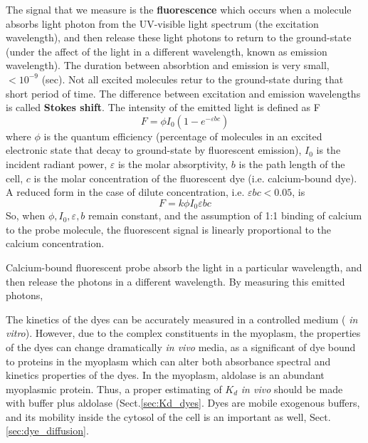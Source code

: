 The signal that we measure is the {\bf fluorescence} which occurs when a
molecule absorbs light photon from the UV-visible light spectrum (the excitation
wavelength), and then release these light photons to return to the ground-state
(under the affect of the light in a different wavelength, known as emission
wavelength). The duration between absorbtion and emission is very small,
$<10^{-9}$ (sec). Not all excited molecules retur to the ground-state during
that short period of time. The difference between excitation and emission
wavelengths is called {\bf Stokes shift}. The intensity of the emitted light is
defined as F
\begin{equation}
F = \phi I_0 \left( 1-e^{-\varepsilon bc} \right)
\end{equation} 
where $\phi$ is the quantum efficiency (percentage of molecules in an excited
electronic state that decay to ground-state by fluorescent emission), $I_0$ is
the incident radiant power, $\varepsilon$ is the molar absorptivity, $b$ is the
path length of the cell, $c$ is the molar concentration of the fluorescent dye
(i.e. calcium-bound dye). A reduced form in the case of dilute concentration,
i.e. $\varepsilon bc <0.05$, is 
\begin{equation}
F = k \phi I_0 \varepsilon bc
\end{equation}
So, when $\phi, I_0, \varepsilon, b$ remain constant, and the assumption of
1:1 binding of calcium to the probe molecule, the fluorescent signal is linearly
proportional to the calcium concentration. 


Calcium-bound fluorescent probe absorb the light in a particular
wavelength, and then release the photons in a different wavelength. By measuring
this emitted photons, 

The kinetics of the dyes can be accurately measured in a controlled medium ({\it
in vitro}). However, due to the complex constituents in the myoplasm, the
properties of the dyes can change dramatically {\it in vivo} media, as a
significant of dye bound to proteins in the myoplasm which can alter both
absorbance spectral and kinetics properties of the dyes.
In the myoplasm, aldolase is an abundant myoplasmic protein. Thus, a proper
estimating of $K_d$ {\it in vivo} should be made with buffer plus aldolase
\citep{harkins1993} (Sect.\ref{sec:Kd_dyes}. Dyes are mobile
exogenous buffers, and its mobility inside the cytosol of the cell is an
important as well, Sect.\ref{sec:dye_diffusion}.

